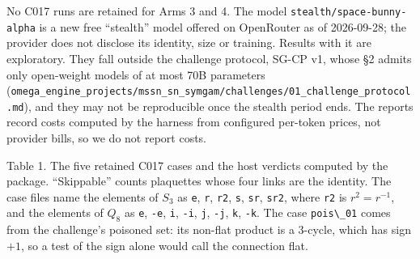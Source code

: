 \documentclass[
  11pt,
]{article}
\newcommand{\passthrough}[1]{#1}
\begin{document}
No C017 runs are retained for Arms 3 and 4. The model
\nolinkurl{stealth/space-bunny-alpha} is a new free ``stealth'' model
offered on OpenRouter as of 2026-09-28; the provider does not disclose
its identity, size or training. Results with it are exploratory. They
fall outside the challenge protocol, SG-CP v1, whose §2 admits only
open-weight models of at most 70B parameters
(\nolinkurl{omega_engine_projects/mssn_sn_symgam/challenges/01_challenge_protocol.md}),
and they may not be reproducible once the stealth period ends. The
reports record costs computed by the harness from configured per-token
prices, not provider bills, so we do not report costs.

Table 1. The five retained C017 cases and the host verdicts computed by
the package. ``Skippable'' counts plaquettes whose four links are the
identity. The case files name the elements of \(S_3\) as
\passthrough{\lstinline!e!}, \passthrough{\lstinline!r!},
\passthrough{\lstinline!r2!}, \passthrough{\lstinline!s!},
\passthrough{\lstinline!sr!}, \passthrough{\lstinline!sr2!}, where
\passthrough{\lstinline!r2!} is \(r^2 = r^{-1}\), and the elements of
\(Q_8\) as \passthrough{\lstinline!e!}, \passthrough{\lstinline!-e!},
\passthrough{\lstinline!i!}, \passthrough{\lstinline!-i!},
\passthrough{\lstinline!j!}, \passthrough{\lstinline!-j!},
\passthrough{\lstinline!k!}, \passthrough{\lstinline!-k!}. The case
\passthrough{\lstinline!pois\_01!} comes from the challenge's poisoned
set: its non-flat product is a 3-cycle, which has sign \(+1\), so a test
of the sign alone would call the connection flat.
\end{document}
